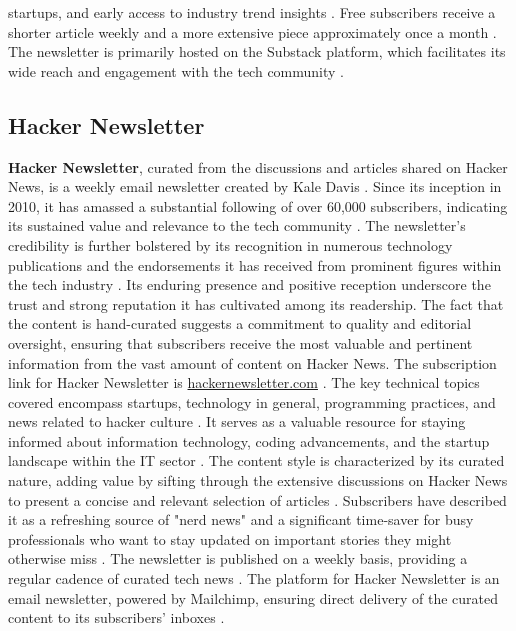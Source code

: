 \documentclass[11pt]{article}
\begin{document}
startups, and early access to industry trend insights \citep{orosz2025jellypod}. Free subscribers receive a shorter article weekly and a more extensive piece approximately once a month \citep{orosz2025jellypod}. The newsletter is primarily hosted on the Substack platform, which facilitates its wide reach and engagement with the tech community \citep{ctoclub2025swe}.

\subsection{Hacker Newsletter}
\textbf{Hacker Newsletter}, curated from the discussions and articles shared on Hacker News, is a weekly email newsletter created by Kale Davis \citep{hackernewsletter2025}. Since its inception in 2010, it has amassed a substantial following of over 60,000 subscribers, indicating its sustained value and relevance to the tech community \citep{ctoclub2025swe}. The newsletter's credibility is further bolstered by its recognition in numerous technology publications and the endorsements it has received from prominent figures within the tech industry \citep{hackernewsletter2025}. Its enduring presence and positive reception underscore the trust and strong reputation it has cultivated among its readership. The fact that the content is hand-curated suggests a commitment to quality and editorial oversight, ensuring that subscribers receive the most valuable and pertinent information from the vast amount of content on Hacker News. The subscription link for Hacker Newsletter is \url{hackernewsletter.com} \citep{ctoclub2025swe}. The key technical topics covered encompass startups, technology in general, programming practices, and news related to hacker culture \citep{runcloud2025worlds}. It serves as a valuable resource for staying informed about information technology, coding advancements, and the startup landscape within the IT sector \citep{runcloud2025worlds}. The content style is characterized by its curated nature, adding value by sifting through the extensive discussions on Hacker News to present a concise and relevant selection of articles \citep{runcloud2025worlds}. Subscribers have described it as a refreshing source of "nerd news" and a significant time-saver for busy professionals who want to stay updated on important stories they might otherwise miss \citep{hackernewsletter2025}. The newsletter is published on a weekly basis, providing a regular cadence of curated tech news \citep{runcloud2025worlds}. The platform for Hacker Newsletter is an email newsletter, powered by Mailchimp, ensuring direct delivery of the curated content to its subscribers' inboxes \citep{hackernewsletter2025}.
\end{document}
